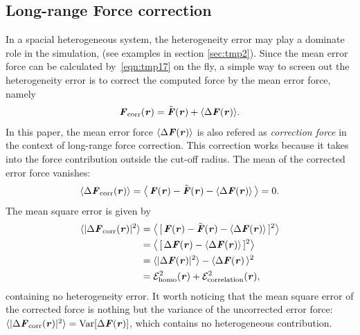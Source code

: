 \documentclass[aps,pre,preprint]{revtex4}
\renewcommand{\v}[1]{\textbf{\textit{#1}}}
\renewcommand{\d}[1]{\textsf{#1}}
\begin{document}

\subsection{Long-range Force correction}

In a spacial heterogeneous system, the heterogeneity error may play a
dominate role in the simulation, (see examples in section
\ref{sec:tmp2}).  Since the mean error force can be calculated
by~\eqref{eqn:tmp17} on the fly, a simple way to screen out the
heterogeneity error is to correct the computed force by the mean error
force, namely
\begin{align}\label{eqn:define-fcorr}
  \v F_{\textrm{corr}}(\v r) = \tilde{\v F}(\v r) + \langle\Delta\v F(\v r)\rangle.
\end{align}
In this paper, the mean error force $\langle\Delta\v F(\v r)\rangle$
is also refered as \emph{correction force} in the context of
long-range force correction. This correction works because it takes
into the force contribution outside the cut-off radius. The mean of
the corrected error force vanishes:
\begin{align}\label{eqn:mean-fcorr}
  \langle\Delta\v F_{\textrm{corr}}(\v r)\rangle
   =
  \big\langle\,
  \v F(\v r) - \tilde{\v F}(\v r) - \langle\Delta\v F(\v r)\rangle\,
  \big\rangle = 0.
\end{align}
The mean square error is given by
\begin{align} \nonumber
  \langle\vert\Delta\v F_{\textrm{corr}}(\v r)\vert^2\rangle
  & =
  \big\langle\,
  [\,\v F(\v r) - \tilde{\v F}(\v r) - \langle\Delta\v F(\v r)\rangle\,]^2
  \big\rangle \\\nonumber
  & =
  \big\langle\,
  [\,\Delta\v F(\v r) - \langle\Delta\v F(\v r)\rangle\,]^2
  \big\rangle \\\nonumber
  & =
  \langle\vert\Delta\v F(\v r)\vert^2\rangle -
  \langle\Delta\v F(\v r)\,\rangle^2 \\
  & =
  \mathcal E^2_{\textrm{homo}}(\v r) +
  \mathcal E^2_{\textrm{correlation}}(\v r),
\end{align}
containing no heterogeneity error.  It worth noticing that the mean
square error of the corrected force is nothing but the variance of the
uncorrected error force: $\langle\vert\Delta\v F_{\textrm{corr}}(\v
r)\vert^2\rangle = \textrm{Var}[\Delta\v F(\v r)]$, which contains no
heterogeneous contribution.
\end{document}
